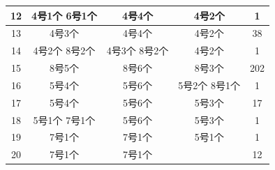 \documentclass{article}
\begin{document}
\begin{table}[!h]
\begin{tabular}{|c|c|c|c|c|}
			12    & 4号1个 6号1个  & 4号4个                                                      & 4号2个      & 1   \\ \hline
			13    & 4号3个       & 4号4个                                                      & 4号2个      & 38  \\ \hline
			14    & 4号2个 8号2个  & 4号3个 8号2个                                                 & 4号2个      & 1   \\ \hline
			15    & 8号5个       & 8号6个                                                      & 8号3个      & 202 \\ \hline
			16    & 5号4个       & 5号6个                                                      & 5号2个 8号1个 & 1   \\ \hline
			17    & 5号4个       & 5号6个                                                      & 5号3个      & 17  \\ \hline
			18    & 5号1个 7号1个  & 5号6个                                                      & 5号3个      & 1   \\ \hline
			19    & 7号1个       & 7号1个                                                      & 5号1个      & 1   \\ \hline
			20    & 7号1个       & 7号1个                                                      &           & 12  \\ \hline
		\end{tabular}
	\end{table}
	
\end{document}
